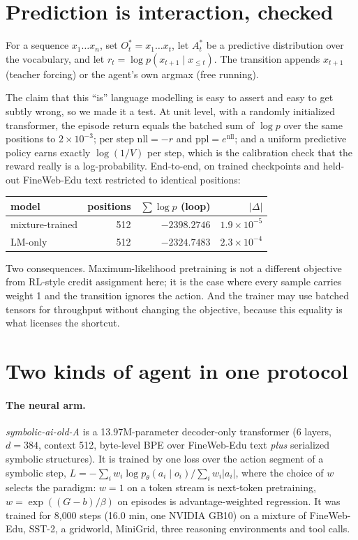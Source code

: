 \documentclass[11pt]{article}
\begin{document}
\section{Prediction is interaction, checked}
\label{sec:equiv}

For a sequence $x_1\ldots x_n$, set $O^*_t = x_1\ldots x_t$, let $A^*_t$ be a
predictive distribution over the vocabulary, and let
$r_t = \log p(x_{t+1}\mid x_{\le t})$. The transition appends $x_{t+1}$ (teacher
forcing) or the agent's own argmax (free running).

The claim that this ``is'' language modelling is easy to assert and easy to get
subtly wrong, so we made it a test. At unit level, with a randomly initialized
transformer, the episode return equals the batched sum of $\log p$ over the same
positions to $2\times10^{-3}$; per step $\text{nll} = -r$ and
$\text{ppl}=e^{\text{nll}}$; and a uniform predictive policy earns exactly
$\log(1/V)$ per step, which is the calibration check that the reward really is a
log-probability. End-to-end, on trained checkpoints and held-out FineWeb-Edu
text restricted to identical positions:

\begin{center}\small
\begin{tabular}{lrrr}
\toprule
model & positions & $\sum\log p$ (loop) & $|\Delta|$ \\
\midrule
mixture-trained & 512 & $-2398.2746$ & $1.9\times10^{-5}$\\
LM-only         & 512 & $-2324.7483$ & $2.3\times10^{-4}$\\
\bottomrule
\end{tabular}
\end{center}

Two consequences. Maximum-likelihood pretraining is not a different objective
from RL-style credit assignment here; it is the case where every sample carries
weight 1 and the transition ignores the action. And the trainer may use batched
tensors for throughput without changing the objective, because this equality is
what licenses the shortcut.

\section{Two kinds of agent in one protocol}

\paragraph{The neural arm.} \emph{symbolic-ai-old-A} is a 13.97M-parameter
decoder-only transformer (6 layers, $d=384$, context 512, byte-level BPE over
FineWeb-Edu text \emph{plus} serialized symbolic structures). It is trained by
one loss over the action segment of a symbolic step,
$L = -\sum_i w_i \log p_\theta(a_i \mid o_i) / \sum_i w_i|a_i|$, where the choice
of $w$ selects the paradigm: $w=1$ on a token stream is next-token pretraining,
$w = \exp((G-b)/\beta)$ on episodes is advantage-weighted regression. It was
trained for 8{,}000 steps (16.0 min, one NVIDIA GB10) on a mixture of FineWeb-Edu,
SST-2, a gridworld, MiniGrid, three reasoning environments and tool calls.
\end{document}
